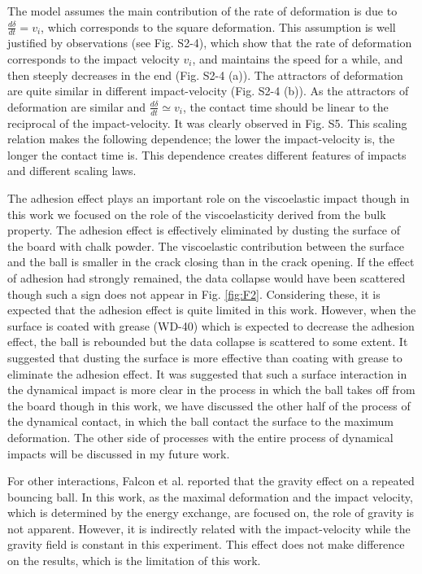 \documentclass[default,iicol,10pt]{sn-jnl}%
\theoremstyle{thmstyleone}%
\theoremstyle{thmstyletwo}%
\theoremstyle{thmstylethree}%
\begin{document}
The model assumes the main contribution of the rate of deformation is due to $\frac{d \delta}{dt} = v_i$, which corresponds to the square deformation. This assumption is well justified by observations (see Fig. S2-4)\cite{SMD}, which show that the rate of deformation corresponds to the impact velocity $v_i$,  and maintains the speed for a while, and then steeply decreases in the end (Fig. S2-4 (a)). The attractors of deformation are quite similar in different impact-velocity (Fig. S2-4 (b)). As the attractors of deformation are similar and $\frac{d \delta}{dt} \simeq v_i$, the contact time should be linear to the reciprocal of the impact-velocity. It was clearly observed in Fig. S5. This scaling relation makes the following dependence; the lower the impact-velocity is, the longer the contact time is. This dependence creates different features of impacts and different scaling laws. 

The adhesion effect plays an important role on the viscoelastic impact though in this work we focused on the role of the viscoelasticity derived from the bulk property. The adhesion effect is effectively eliminated by dusting the surface of the board with chalk powder\cite{Persson,RobThoms}. The viscoelastic contribution between the surface and the ball is smaller in the crack closing than in the crack opening\cite{Persson}. If the effect of adhesion had strongly remained, the data collapse would have been scattered though such a sign does not appear in Fig. \ref{fig:F2}. Considering these, it is expected that the adhesion effect is quite limited in this work. However, when the surface is coated with grease (WD-40) which is expected to decrease the adhesion effect, the ball is rebounded but the data collapse is scattered to some extent\cite{SurWD}. It suggested that dusting the surface is more effective than coating with grease to eliminate the adhesion effect. It was suggested that such a surface interaction in the dynamical impact is more clear in the process in which the ball takes off from the board though in this work, we have discussed the other half of the process of the dynamical contact, in which the ball contact the surface to the maximum deformation. The other side of processes with the entire process of dynamical impacts will be discussed in my future work.

For other interactions, Falcon et al. reported that the gravity effect on a repeated bouncing ball\cite{Falcon}. In this work, as the maximal deformation and the impact velocity, which is determined by the energy exchange, are focused on, the role of gravity is not apparent. However, it is indirectly related with the impact-velocity while the gravity field is constant in this experiment. This effect does not make difference on the results, which is the limitation of this work.
\end{document}
